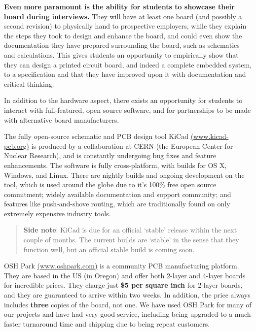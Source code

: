 \documentclass[12pt]{article}
\numberwithin{figure}{section}
\numberwithin{equation}{section}
\begin{document}
{\bigskip

\textbf{Even more paramount is the ability for students to showcase
their board during interviews.} They will have at least one board
(and possibly a second revision) to physically hand to prospective employers,
while they explain the steps they took to design and enhance the board,
and could even show the documentation they have prepared surrounding the
board, such as schematics and calculations. This gives students an
opportunity to empirically show that they can design a printed circuit
board, and indeed a complete embedded system, to a specification and
that they have improved upon it with documentation and critical
thinking.

\bigskip

In addition to the hardware aspect, there exists an opportunity for
students to interact with full-featured, open source software, and for
partnerships to be made with alternative board manufacturers.

\bigskip

The fully open-source schematic and PCB design tool KiCad
\href{https://www.kicad-pcb.org}{(www.kicad-pcb.org)} is produced by a
collaboration at CERN (the European Center for Nuclear Research), and is
constantly undergoing bug fixes and feature enhancements. The software
is fully cross-platform, with builds for OS X, Windows, and Linux. There
are nightly builds and ongoing development on the tool, which is used
around the globe due to it's 100\% free open source commitment; widely
available documentation and support community; and features like
push-and-shove routing, which are traditionally found on only extremely
expensive industry tools.

\begin{quote}
\textbf{Side note}: KiCad is due for an official `stable' release within
the next couple of months. The current builds are `stable' in the sense
that they function well, but an official stable build is coming soon.
\end{quote}

OSH Park \href{https://www.oshpark.com}{(www.oshpark.com)} is a community PCB
manufacturing platform. They are based in the US (in Oregon) and offer
both 2-layer and 4-layer boards for incredible prices. They charge just
\textbf{\$5 per square inch} for 2-layer boards, and they are guaranteed
to arrive within two weeks. In addition, the price always includes
\textbf{three} copies of the board, not one. We have used OSH Park for
many of our projects and have had very good service, including being
upgraded to a much faster turnaround time and shipping due to being
repeat customers.

}
\end{document}

